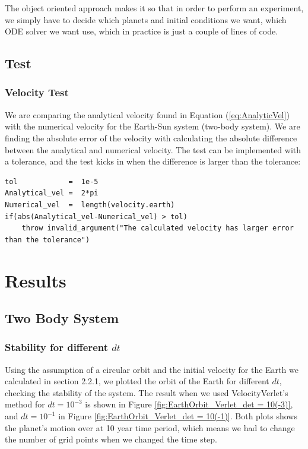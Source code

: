 \documentclass[norsk,a4paper,12pt]{article}
\begin{document}
{The object oriented approach makes it so that in order to perform an experiment, we simply have to decide which planets and initial conditions we want, which ODE solver we want use, which in practice is just a couple of lines of code.

\subsection{Test}
\subsubsection{Velocity Test}
We are comparing the analytical velocity found in Equation ({\ref{eq:AnalyticVel}}) with the numerical velocity for the Earth-Sun system (two-body system). We are finding the absolute error of the velocity with calculating the absolute difference between the analytical and numerical velocity. The test can be implemented with a tolerance, and the test kicks in when the difference is larger than the tolerance:
\begin{lstlisting}
tol            =  1e-5
Analytical_vel =  2*pi
Numerical_vel  =  length(velocity.earth)
if(abs(Analytical_vel-Numerical_vel) > tol)
    throw invalid_argument("The calculated velocity has larger error than the tolerance")
\end{lstlisting}

\section{Results}
\subsection{Two Body System}
\subsubsection{Stability for different $dt$}

Using the assumption of a circular orbit and the initial velocity for the Earth we calculated in section 2.2.1, we plotted the orbit of the Earth for different $dt$, checking the stability of the system. The result when we used VelocityVerlet's method for $dt = 10^{-3}$ is shown in Figure \ref{fig:EarthOrbit_Verlet_det = 10(-3)}, and $dt = 10^{-1}$ in Figure \ref{fig:EarthOrbit_Verlet_det = 10(-1)}. Both plots shows the planet's motion over at 10 year time period, which means we had to change the number of grid points when we changed the time step.
\par 
\vspace{3mm}

}
\end{document}
